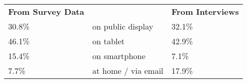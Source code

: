 \begin{tabular}{lllll}
\multicolumn{2}{l}{\textbf{From Survey Data}} &  & \multicolumn{2}{l}{\textbf{From Interviews}} \\
30.8\%                   & \multicolumn{3}{l}{on public display}      & 32.1\%                  \\
46.1\%                   & \multicolumn{3}{l}{on tablet}              & 42.9\%                  \\
15.4\%                   & \multicolumn{3}{l}{on smartphone}          & 7.1\%                   \\
7.7\%                    & \multicolumn{3}{l}{at home / via email}    & 17.9\%                 
\end{tabular}

